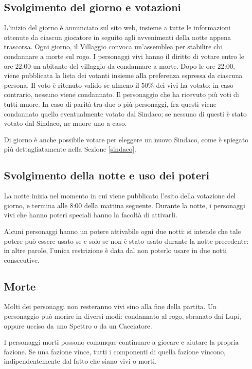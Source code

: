 \documentclass[a4paper,10pt]{article}
\begin{document}
\subsection{Svolgimento del giorno e votazioni}

L'inizio del giorno è annunciato sul sito web, insieme a tutte le informazioni
ottenute da ciascun giocatore in seguito agli avvenimenti della notte appena
trascorsa.
Ogni giorno, il Villaggio convoca un'assemblea per stabilire chi condannare a
morte sul rogo.
I personaggi vivi hanno il diritto di votare entro le ore 22:00 un abitante del
villaggio da condannare a morte. Dopo le ore 22:00, viene pubblicata la lista dei
votanti insieme alla preferenza espressa da ciascuna persona.
Il voto è ritenuto valido se almeno il 50\% dei vivi ha votato; in caso
contrario, nessuno viene condannato. Il personaggio che ha ricevuto più voti di
tutti muore.
In caso di parità tra due o più personaggi, fra questi viene condannato quello
eventualmente votato dal Sindaco; se nessuno di questi è stato votato dal
Sindaco, ne muore uno a caso.

Di giorno è anche possibile votare per eleggere un nuovo Sindaco, come è
spiegato più dettagliatamente nella Sezione \ref{sindaco}.


\subsection{Svolgimento della notte e uso dei poteri}

La notte inizia nel momento in cui viene pubblicato l'esito della votazione del
giorno, e termina alle 8:00 della mattina seguente.
Durante la notte, i personaggi vivi che hanno poteri speciali hanno la facoltà
di attivarli.

Alcuni personaggi hanno un potere attivabile ogni due notti: si intende che tale
potere può essere usato se e solo se non è stato usato durante la notte
precedente: in altre parole, l'unica restrizione è data dal non poterlo usare in
due notti consecutive.

\subsection{Morte}

Molti dei personaggi non resteranno vivi sino alla fine della partita. Un
personaggio può morire in diversi modi: condannato al rogo, sbranato dai Lupi,
oppure ucciso da uno Spettro o da un Cacciatore.

I personaggi morti possono comunque continuare a giocare e aiutare la propria fazione.
Se una fazione vince, tutti i componenti di quella fazione vincono,
indipendentemente dal fatto che siano vivi o morti.
\end{document}
